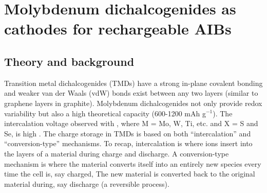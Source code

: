 \chapter{Molybdenum dichalcogenides as cathodes for rechargeable AIBs} %

\label{chap4} %

\section{Theory and background}
Transition metal dichalcogenides (TMDs) have a strong in-plane covalent bonding and weaker van der Waals (vdW) bonds exist between any two layers (similar to graphene layers in graphite). Molybdenum dichalcogenides not only provide redox variability but also a high theoretical capacity (600-1200 mAh g$^{-1}$). The intercalation voltage observed with , where M = Mo, W, Ti, etc. and X = S and Se, is high \cite{cong_intrinsic_2015}. The charge storage in TMDs is based on both \enquote{intercalation} and \enquote{conversion-type} mechanisms. To recap, intercalation is where ions insert into the layers of a material during charge and discharge. A conversion-type mechanism is where the material converts itself into an entirely new species every time the cell is, say charged, The new material is converted back to the original material during, say discharge (a reversible process). 
